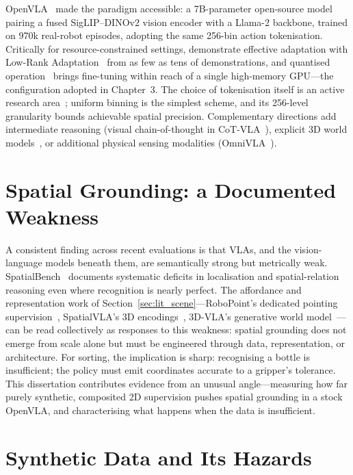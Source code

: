 OpenVLA~\citep{kim2024} made the paradigm accessible: a 7B-parameter open-source model pairing a fused SigLIP--DINOv2 vision encoder with a Llama-2 backbone, trained on 970k real-robot episodes, adopting the same 256-bin action tokenisation. Critically for resource-constrained settings, \citet{kim2024} demonstrate effective adaptation with Low-Rank Adaptation~\citep{hu2021lora} from as few as tens of demonstrations, and quantised operation~\citep{dettmers2023qlora} brings fine-tuning within reach of a single high-memory GPU---the configuration adopted in Chapter~3. The choice of tokenisation itself is an active research area~\citep{zhong2025}; uniform binning is the simplest scheme, and its 256-level granularity bounds achievable spatial precision. Complementary directions add intermediate reasoning (visual chain-of-thought in CoT-VLA~\citep{zhao2025}), explicit 3D world models~\citep{zhen2024}, or additional physical sensing modalities (OmniVLA~\citep{omnivla2025}).

\section{Spatial Grounding: a Documented Weakness}
\label{sec:lit_spatial}

A consistent finding across recent evaluations is that VLAs, and the vision-language models beneath them, are semantically strong but metrically weak. SpatialBench~\citep{cai2024} documents systematic deficits in localisation and spatial-relation reasoning even where recognition is nearly perfect. The affordance and representation work of Section~\ref{sec:lit_scene}---RoboPoint's dedicated pointing supervision~\citep{yuan2024}, SpatialVLA's 3D encodings~\citep{qu2025}, 3D-VLA's generative world model~\citep{zhen2024}---can be read collectively as responses to this weakness: spatial grounding does not emerge from scale alone but must be engineered through data, representation, or architecture. For sorting, the implication is sharp: recognising a bottle is insufficient; the policy must emit coordinates accurate to a gripper's tolerance. This dissertation contributes evidence from an unusual angle---measuring how far purely synthetic, composited 2D supervision pushes spatial grounding in a stock OpenVLA, and characterising what happens when the data is insufficient.

\section{Synthetic Data and Its Hazards}
\label{sec:lit_synthetic}

